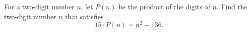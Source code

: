 For a two-digit number $n$, let $P(n)$ be the product of the digits of $n$. Find the two-digit number $n$ that satisfies
\[
15\cdot P(n)=n^2-136 .
\]

